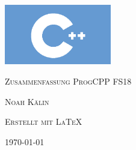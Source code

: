 
\begin{titlepage}
	\centering
	\includegraphics[width=0.35\textwidth]{images/cpp-logo.png}\par\vspace{2cm}
	{\scshape\LARGE Zusammenfassung ProgCPP FS18\par}
	\vspace{3cm}
	{\scshape\Large Noah Kälin\par}
	\vspace{5cm}
	{\scshape Erstellt mit \LaTeX{}\par}
	\vspace{5cm}
	{\today}
	\vfill
\end{titlepage}